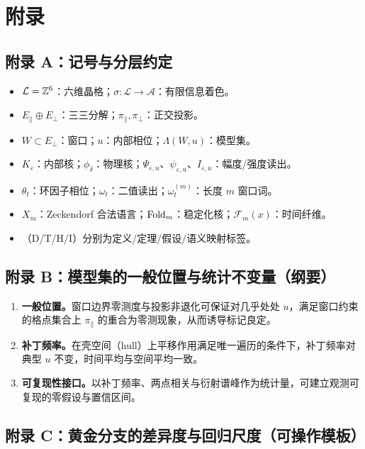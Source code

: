\section{附录}

\subsection{附录 A：记号与分层约定}
\label{app:notation}

\begin{itemize}
  \item $\mathcal{L}=\mathbb{Z}^6$：六维晶格；$\sigma:\mathcal{L}\to\mathcal{A}$：有限信息着色。
  \item $E_{\parallel}\oplus E_{\perp}$：三三分解；$\pi_{\parallel},\pi_{\perp}$：正交投影。
  \item $W\subset E_{\perp}$：窗口；$u$：内部相位；$\Lambda(W,u)$：模型集。
  \item $K_{\varepsilon}$：内部核；$\phi_{\delta}$：物理核；$\Psi_{\varepsilon,u}$、$\psi_{\varepsilon,u}$、$I_{\varepsilon,u}$：幅度/强度读出。
  \item $\theta_t$：环因子相位；$\omega_t$：二值读出；$\omega_t^{(m)}$：长度 $m$ 窗口词。
  \item $X_m$：Zeckendorf 合法语言；$\mathrm{Fold}_m$：稳定化核；$\mathcal{F}_m(x)$：时间纤维。
  \item （D/T/H/I）分别为定义/定理/假设/语义映射标签。
\end{itemize}

\subsection{附录 B：模型集的一般位置与统计不变量（纲要）}
\label{app:general-position}

\begin{enumerate}
  \item \textbf{一般位置。}窗口边界零测度与投影非退化可保证对几乎处处 $u$，满足窗口约束的格点集合上 $\pi_{\parallel}$ 的重合为零测现象，从而诱导标记良定。
  \item \textbf{补丁频率。}在壳空间（hull）上平移作用满足唯一遍历的条件下，补丁频率对典型 $u$ 不变，时间平均与空间平均一致。
  \item \textbf{可复现性接口。}以补丁频率、两点相关与衍射谱峰作为统计量，可建立观测可复现的零假设与置信区间。
\end{enumerate}

\subsection{附录 C：黄金分支的差异度与回归尺度（可操作模板）}
\label{app:golden-branch}

